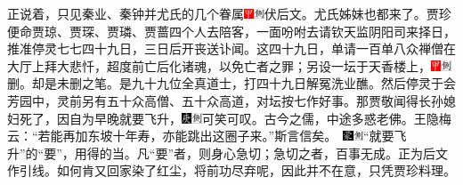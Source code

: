 正说着，只见秦业、秦钟并尤氏的几个眷属{\includegraphics[width=3mm]{../Images/00002}\includegraphics[width=3mm]{../Images/00011}\footnotesize \kaishu 伏后文。}尤氏姊妹也都来了。贾珍便命贾琼、贾琛、贾璘、贾蔷四个人去陪客，一面吩咐去请钦天监阴阳司来择日，推准停灵七七四十九日，三日后开丧送讣闻。这四十九日，单请一百单八众禅僧在大厅上拜大悲忏，超度前亡后化诸魂，以免亡者之罪；另设一坛于天香楼上，{\includegraphics[width=3mm]{../Images/00002}\includegraphics[width=3mm]{../Images/00011}\footnotesize \kaishu 删。却是未删之笔。}是九十九位全真道士，打四十九日解冤洗业醮。然后停灵于会芳园中，灵前另有五十众高僧、五十众高道，对坛按七作好事。那贾敬闻得长孙媳妇死了，因自为早晚就要飞升，{{\includegraphics[width=3mm]{../Images/00004}\includegraphics[width=3mm]{../Images/00011}\footnotesize \kaishu 可笑可叹。古今之儒，中途多惑老佛。王隐梅云：``若能再加东坡十年寿，亦能跳出这圈子来。''斯言信矣。　}\includegraphics[width=3mm]{../Images/00006}\includegraphics[width=3mm]{../Images/00011}\footnotesize \kaishu ``就要飞升''的``要''，用得的当。凡``要''者，则身心急切；急切之者，百事无成。正为后文作引线。}如何肯又回家染了红尘，将前功尽弃呢，因此并不在意，只凭贾珍料理。

